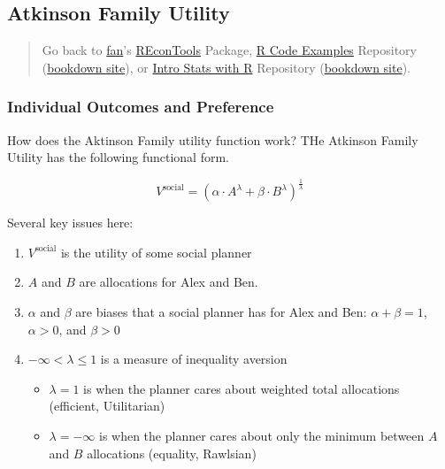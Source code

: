 \documentclass[
]{book}
\providecommand{\tightlist}{%
  \setlength{\itemsep}{0pt}\setlength{\parskip}{0pt}}
\begin{document}
\hypertarget{atkinson-family-utility}{%
\subsection{Atkinson Family Utility}\label{atkinson-family-utility}}

\begin{quote}
Go back to \href{http://fanwangecon.github.io/}{fan}'s \href{https://fanwangecon.github.io/REconTools/}{REconTools} Package, \href{https://fanwangecon.github.io/R4Econ/}{R Code Examples} Repository (\href{https://fanwangecon.github.io/R4Econ/bookdown}{bookdown site}), or \href{https://fanwangecon.github.io/Stat4Econ/}{Intro Stats with R} Repository (\href{https://fanwangecon.github.io/Stat4Econ/bookdown}{bookdown site}).
\end{quote}

\hypertarget{individual-outcomes-and-preference}{%
\subsubsection{Individual Outcomes and Preference}\label{individual-outcomes-and-preference}}

How does the Aktinson Family utility function work? THe Atkinson Family Utility has the following functional form.

\[
V^{\text{social}}
=
\left(
\alpha
\cdot
A^{\lambda}
+
\beta
\cdot
B^{\lambda}
\right)^{\frac{1}{\lambda}}
\]

Several key issues here:

\begin{enumerate}
\def\labelenumi{\arabic{enumi}.}
\tightlist
\item
  \(V^{\text{social}}\) is the utility of some social planner
\item
  \(A\) and \(B\) are allocations for Alex and Ben.
\item
  \(\alpha\) and \(\beta\) are biases that a social planner has for Alex and Ben: \(\alpha+\beta=1\), \(\alpha>0\), and \(\beta>0\)
\item
  \(-\infty < \lambda \le 1\) is a measure of inequality aversion

  \begin{itemize}
  \tightlist
  \item
    \(\lambda=1\) is when the planner cares about weighted total allocations (efficient, Utilitarian)
  \item
    \(\lambda=-\infty\) is when the planner cares about only the minimum between \(A\) and \(B\) allocations (equality, Rawlsian)
  \end{itemize}
\end{enumerate}
\end{document}
